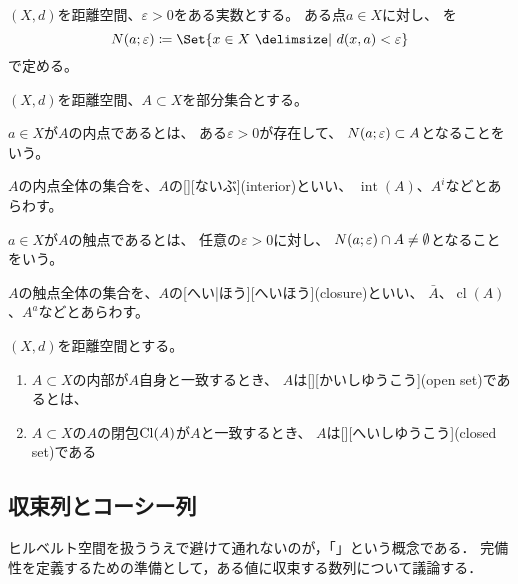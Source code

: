 \documentclass[../sotsu.tex]{subfiles}
\begin{document}
\begin{definition}
    $(X, d)$を距離空間、$\varepsilon > 0$をある実数とする。
    ある点$a \in X$に対し、%
    を
    \begin{equation}
        \neigh(a; \varepsilon) \coloneq \Set{  x \in X  \given  d(x, a) < \varepsilon  }
    \end{equation}
    で定める。
\end{definition}

$(X, d)$を距離空間、$A \subset X$を部分集合とする。

\begin{definition}
    $a \in X$が$A$の内点であるとは、
    ある$\varepsilon > 0$が存在して、
    $N(a; \varepsilon) \subset A$となることをいう。

    $A$の内点全体の集合を、$A$の[][ないぶ](interior)といい、
    $\operatorname{int}(A)$、$A^i$などとあらわす。
\end{definition}

\begin{definition}
    $a \in X$が$A$の触点であるとは、
    任意の$\varepsilon > 0$に対し、
    $N(a; \varepsilon) \cap A \neq \emptyset$となることをいう。

    $A$の触点全体の集合を、$A$の[へい|ほう][へいほう](closure)といい、
    $\bar{A}$、$\operatorname{cl}(A)$、$A^a$などとあらわす。
\end{definition}


\begin{definition}[開集合と閉集合]
    \label{dfn:open-set-and-closed-set}
    $(X, d)$を距離空間とする。
    \begin{enumerate}
        \item $A \subset X$の内部が$A$自身と一致するとき、
            $A$は[][かいしゆうこう](open set)であるとは、
        \item $A \subset X$の$A$の閉包$\mathrm{Cl}(A)$が$A$と一致するとき、
            $A$は[][へいしゆうこう](closed set)である
    \end{enumerate}
\end{definition}



\subsection{収束列とコーシー列}

ヒルベルト空間を扱ううえで避けて通れないのが，「」という概念である．
完備性を定義するための準備として，ある値に収束する数列について議論する．
\end{document}
